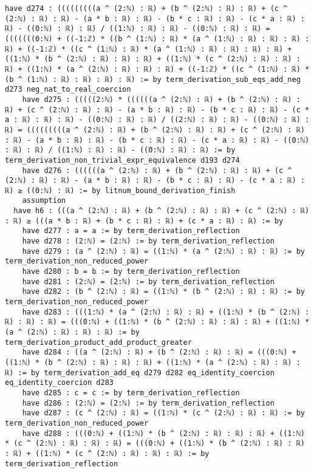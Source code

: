 \documentclass{article}
\begin{document}
\begin{tcolorbox}[colback=white!10, width=\linewidth]
\begin{lstlisting}[language=Lean4]
    have d274 : (((((((((a ^ (2:ℕ) : ℝ) + (b ^ (2:ℕ) : ℝ) : ℝ) + (c ^ (2:ℕ) : ℝ) : ℝ) - (a * b : ℝ) : ℝ) - (b * c : ℝ) : ℝ) - (c * a : ℝ) : ℝ) - ((0:ℕ) : ℝ) : ℝ) / ((1:ℕ) : ℝ) : ℝ) - ((0:ℕ) : ℝ) : ℝ) = (((((((0:ℕ) + ((-1:ℤ) * ((b ^ (1:ℕ) : ℝ) * (a ^ (1:ℕ) : ℝ) : ℝ) : ℝ) : ℝ) + ((-1:ℤ) * ((c ^ (1:ℕ) : ℝ) * (a ^ (1:ℕ) : ℝ) : ℝ) : ℝ) : ℝ) + ((1:ℕ) * (b ^ (2:ℕ) : ℝ) : ℝ) : ℝ) + ((1:ℕ) * (c ^ (2:ℕ) : ℝ) : ℝ) : ℝ) + ((1:ℕ) * (a ^ (2:ℕ) : ℝ) : ℝ) : ℝ) + ((-1:ℤ) * ((c ^ (1:ℕ) : ℝ) * (b ^ (1:ℕ) : ℝ) : ℝ) : ℝ) : ℝ) := by term_derivation_sub_eqs_add_neg d273 neg_nat_to_real_coercion
    have d275 : (((((2:ℕ) * ((((((a ^ (2:ℕ) : ℝ) + (b ^ (2:ℕ) : ℝ) : ℝ) + (c ^ (2:ℕ) : ℝ) : ℝ) - (a * b : ℝ) : ℝ) - (b * c : ℝ) : ℝ) - (c * a : ℝ) : ℝ) : ℝ) - ((0:ℕ) : ℝ) : ℝ) / ((2:ℕ) : ℝ) : ℝ) - ((0:ℕ) : ℝ) : ℝ) = (((((((((a ^ (2:ℕ) : ℝ) + (b ^ (2:ℕ) : ℝ) : ℝ) + (c ^ (2:ℕ) : ℝ) : ℝ) - (a * b : ℝ) : ℝ) - (b * c : ℝ) : ℝ) - (c * a : ℝ) : ℝ) - ((0:ℕ) : ℝ) : ℝ) / ((1:ℕ) : ℝ) : ℝ) - ((0:ℕ) : ℝ) : ℝ) := by term_derivation_non_trivial_expr_equivalence d193 d274
    have d276 : ((((((a ^ (2:ℕ) : ℝ) + (b ^ (2:ℕ) : ℝ) : ℝ) + (c ^ (2:ℕ) : ℝ) : ℝ) - (a * b : ℝ) : ℝ) - (b * c : ℝ) : ℝ) - (c * a : ℝ) : ℝ) ≥ ((0:ℕ) : ℝ) := by litnum_bound_derivation_finish
    assumption
  have h6 : (((a ^ (2:ℕ) : ℝ) + (b ^ (2:ℕ) : ℝ) : ℝ) + (c ^ (2:ℕ) : ℝ) : ℝ) ≥ (((a * b : ℝ) + (b * c : ℝ) : ℝ) + (c * a : ℝ) : ℝ) := by
    have d277 : a = a := by term_derivation_reflection
    have d278 : (2:ℕ) = (2:ℕ) := by term_derivation_reflection
    have d279 : (a ^ (2:ℕ) : ℝ) = ((1:ℕ) * (a ^ (2:ℕ) : ℝ) : ℝ) := by term_derivation_non_reduced_power
    have d280 : b = b := by term_derivation_reflection
    have d281 : (2:ℕ) = (2:ℕ) := by term_derivation_reflection
    have d282 : (b ^ (2:ℕ) : ℝ) = ((1:ℕ) * (b ^ (2:ℕ) : ℝ) : ℝ) := by term_derivation_non_reduced_power
    have d283 : (((1:ℕ) * (a ^ (2:ℕ) : ℝ) : ℝ) + ((1:ℕ) * (b ^ (2:ℕ) : ℝ) : ℝ) : ℝ) = (((0:ℕ) + ((1:ℕ) * (b ^ (2:ℕ) : ℝ) : ℝ) : ℝ) + ((1:ℕ) * (a ^ (2:ℕ) : ℝ) : ℝ) : ℝ) := by term_derivation_product_add_product_greater
    have d284 : ((a ^ (2:ℕ) : ℝ) + (b ^ (2:ℕ) : ℝ) : ℝ) = (((0:ℕ) + ((1:ℕ) * (b ^ (2:ℕ) : ℝ) : ℝ) : ℝ) + ((1:ℕ) * (a ^ (2:ℕ) : ℝ) : ℝ) : ℝ) := by term_derivation_add_eq d279 d282 eq_identity_coercion eq_identity_coercion d283
    have d285 : c = c := by term_derivation_reflection
    have d286 : (2:ℕ) = (2:ℕ) := by term_derivation_reflection
    have d287 : (c ^ (2:ℕ) : ℝ) = ((1:ℕ) * (c ^ (2:ℕ) : ℝ) : ℝ) := by term_derivation_non_reduced_power
    have d288 : (((0:ℕ) + ((1:ℕ) * (b ^ (2:ℕ) : ℝ) : ℝ) : ℝ) + ((1:ℕ) * (c ^ (2:ℕ) : ℝ) : ℝ) : ℝ) = (((0:ℕ) + ((1:ℕ) * (b ^ (2:ℕ) : ℝ) : ℝ) : ℝ) + ((1:ℕ) * (c ^ (2:ℕ) : ℝ) : ℝ) : ℝ) := by term_derivation_reflection

\end{lstlisting}
\end{tcolorbox}
\end{document}
